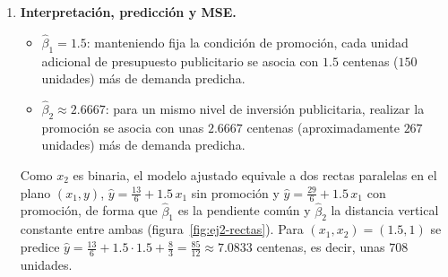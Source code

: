 \begin{enumerate}
\item \textbf{Interpretación, predicción y MSE.}
\begin{itemize}
    \item $\hat\beta_1=1.5$: manteniendo fija la condición de promoción,
    cada unidad adicional de presupuesto publicitario se asocia con
    $1.5$ centenas ($150$ unidades) más de demanda predicha.
    \item $\hat\beta_2\approx2.6667$: para un mismo nivel de inversión
    publicitaria, realizar la promoción se asocia con unas $2.6667$
    centenas (aproximadamente $267$ unidades) más de demanda predicha.
\end{itemize}
Como $x_2$ es binaria, el modelo ajustado equivale a dos rectas
paralelas en el plano $(x_1,y)$, $\hat y=\tfrac{13}{6}+1.5\,x_1$ sin
promoción y $\hat y=\tfrac{29}{6}+1.5\,x_1$ con promoción, de forma que
$\hat\beta_1$ es la pendiente común y $\hat\beta_2$ la distancia
vertical constante entre ambas (figura~\ref{fig:ej2-rectas}).
Para $(x_1,x_2)=(1.5,1)$ se predice
$\hat y=\tfrac{13}{6}+1.5\cdot1.5+\tfrac83=\tfrac{85}{12}\approx7.0833$
centenas, es decir, unas $708$ unidades.


\end{enumerate}

